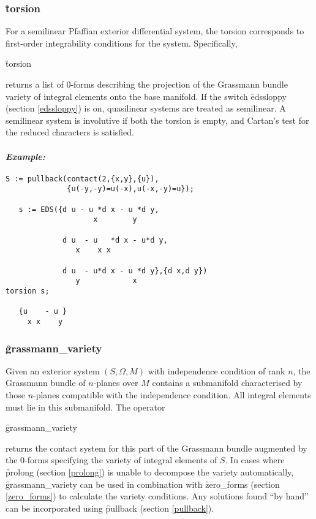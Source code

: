 \subsubsection{\f{torsion}}
\label{torsion}

\hypertarget{operator:TORSION}{}
For a semilinear Pfaffian exterior differential system, the torsion
corresponds to first-order integrability conditions for the
system. Specifically,
\begin{syntax}
	\f{torsion} 
\end{syntax}
returns a list of 0-forms describing the projection of the Grassmann bundle
variety of integral elements onto the base manifold. If the switch
\f{edssloppy} (section \ref{edssloppy}) is on, quasilinear systems are
treated as semilinear. A semilinear system is involutive if both the
torsion is empty, and Cartan's test for the reduced characters is
satisfied.

\paragraph{\textit{Example:}}
\begin{verbatim}
S := pullback(contact(2,{x,y},{u}),
              {u(-y,-y)=u(-x),u(-x,-y)=u});

   s := EDS({d u - u *d x - u *d y,
                    x        y

             d u  - u   *d x - u*d y,
                x    x x

             d u  - u*d x - u *d y},{d x,d y})
                y            x
torsion s;

   {u    - u }
     x x    y
\end{verbatim}

\subsubsection{\f{grassmann\_variety}}
\label{grassmann_variety}

\hypertarget{operator:GRASSMANN_VARIETY}{}
Given an exterior system $(S,\Omega,M)$ with independence condition of
rank $n$, the Grassmann bundle of $n$-planes over $M$ contains a
submanifold characterised by those $n$-planes compatible with the
independence condition. All integral elements must lie in this
submanifold. The operator
\begin{syntax}
	\f{grassmann\_variety} 
\end{syntax}
returns the contact system for this part of the Grassmann bundle augmented
by the 0-forms specifying the variety of integral elements of $S$. In cases
where \f{prolong} (section \ref{prolong}) is unable to decompose the
variety automatically, \f{grassmann\_variety} can be used in combination
with \f{zero\_forms} (section \ref{zero_forms}) to calculate the variety
conditions. Any solutions found ``by hand'' can be incorporated using
\f{pullback} (section \ref{pullback}).

